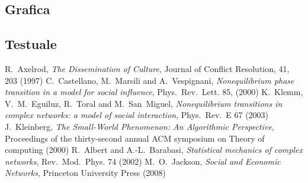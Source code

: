 \documentclass[a4paper,12pt]{article}
\begin{document}
\subsection{Grafica}
\subsection{Testuale}


\clearpage
\begin{thebibliography}{10}
\normalsize
  R.~Axelrod, \textit{The Dissemination of Culture}, Journal of Conflict Resolution, 41, 203 (1997)
  C.~Castellano, M.~Marsili and A.~Vespignani, \textit{Nonequilibrium phase transition in a model for social influence}, Phys.~Rev.~Lett. 85, (2000)
  K.~Klemm, V.~M.~Eguiluz, R.~Toral and M.~San~Miguel, \textit{Nonequilibrium transitions in complex networks: a model of social interaction}, Phys.~Rev.~E 67 (2003)
  J.~Kleinberg, \textit{The Small-World Phenomenon: An Algorithmic Perspective}, Proceedings of the thirty-second annual ACM symposium on Theory of computing (2000)
  R.~Albert and A.-L.~Barabasi, \textit{Statistical mechanics of complex networks}, Rev.~Mod.~Phys. 74 (2002)
  M.~O.~Jackson, \textit{Social and Economic Networks}, Princeton University Press (2008) 
\end{thebibliography}
\end{document}
